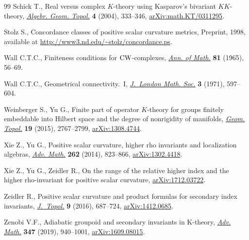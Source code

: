 \documentclass[10pt,a4paper]{amsart}
\numberwithin{equation}{section}
\begin{document}
\begin{thebibliography}{99}
Schick T., Real versus complex {$K$}-theory using {K}asparov's bivariant
 {$KK$}-theory, \href{https://doi.org/10.2140/agt.2004.4.333}{\textit{Algebr. Geom. Topol.}} \textbf{4} (2004), 333--346,
 \href{https://arxiv.org/abs/math.KT/0311295}{arXiv:math.KT/0311295}.

Stolz S., Concordance classes of positive scalar curvature metrics, {P}reprint,
 1998, available at \url{http://www3.nd.edu/~stolz/concordance.ps}.

Wall C.T.C., Finiteness conditions for {${\rm CW}$}-complexes, \href{https://doi.org/10.2307/1970382}{\textit{Ann. of
 Math.}} \textbf{81} (1965), 56--69.

Wall C.T.C., Geometrical connectivity.~{I}, \href{https://doi.org/10.1112/jlms/s2-3.4.597}{\textit{J.~London Math. Soc.}}
 \textbf{3} (1971), 597--604.

Weinberger S., Yu G., Finite part of operator {$K$}-theory for groups finitely
 embeddable into {H}ilbert space and the degree of nonrigidity of manifolds,
 \href{https://doi.org/10.2140/gt.2015.19.2767}{\textit{Geom. Topol.}} \textbf{19} (2015), 2767--2799, \href{https://arxiv.org/abs/1308.4744}{arXiv:1308.4744}.

Xie Z., Yu G., Positive scalar curvature, higher rho invariants and
 localization algebras, \href{https://doi.org/10.1016/j.aim.2014.06.001}{\textit{Adv. Math.}} \textbf{262} (2014), 823--866,
 \href{https://arxiv.org/abs/#2}{arXiv:1302.4418}.

Xie Z., Yu G., Zeidler R., On the range of the relative higher index and the
 higher rho-invariant for positive scalar curvature, \href{https://arxiv.org/abs/1712.03722}{arXiv:1712.03722}.

Zeidler R., Positive scalar curvature and product formulas for secondary index
 invariants, \href{https://doi.org/10.1112/jtopol/jtw005}{\textit{J.~Topol.}} \textbf{9} (2016), 687--724,
 \href{https://arxiv.org/abs/1412.0685}{arXiv:1412.0685}.

Zenobi V.F., Adiabatic groupoid and secondary invariants in {K}-theory,
 \href{https://doi.org/10.1016/j.aim.2019.03.003}{\textit{Adv. Math.}} \textbf{347} (2019), 940--1001, \href{https://arxiv.org/abs/1609.08015}{arXiv:1609.08015}.

\end{thebibliography}
\end{document}

